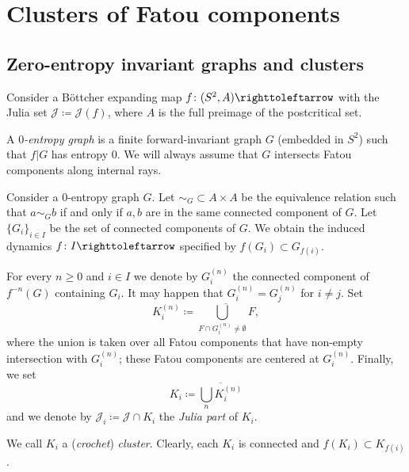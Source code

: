 \documentclass{amsart}
\theoremstyle{plain}
\theoremstyle{definition}
\theoremstyle{remark}
\newcommand{\Jul}{{\mathcal J}}
\newcommand\selfmap{\righttoleftarrow}
\begin{document}
\section{Clusters of Fatou components}
\label{sec:clusters}





\subsection{Zero-entropy invariant graphs and clusters}

Consider a B\"ottcher expanding map $f\colon (S^2,A)\selfmap$ with the Julia set $\Jul\coloneq \Jul(f)$, where $A$ is the full preimage of the postcritical set.

A \emph{$0$-entropy graph} is a finite forward-invariant graph $G$ (embedded in $S^2$) such that $f|G$ has entropy $0$. We will always assume that $G$ intersects Fatou components along internal rays.

Consider a $0$-entropy graph $G$. Let $\sim_{G}\subset A\times A$ be the equivalence relation such that $a\sim_G b$ if and only if $a,b$ are in the same connected component of $G$. Let $\{G_i\}_{i\in I}$ be the set of connected components of $G$. We obtain the induced dynamics $f\colon I\selfmap$ specified by $f(G_i)\subset G_{f(i)}$.

For every $n\ge0$ and $i\in I$ we denote by $G^{(n)}_i$ the connected component of $ f^{-n}(G)$ containing $G_i$. It may happen that $ G^{(n)}_i= G^{(n)}_j$ for $i\not=j$. Set \[K_i^{(n)} \coloneq \overline{\bigcup _{F\cap G_i^{(n)}\not=\emptyset} F},\]
where the union is taken over all Fatou components that have non-empty intersection with $G_i^{(n)}$; these Fatou components are centered at $G_i^{(n)}$. Finally, we set
\[K_i\coloneq  \overline{\bigcup_{n}K_i^{(n)}}\]
and we denote by
$\Jul_i\coloneq \Jul\cap K_i$ the \emph{Julia part} of $K_i$.


We call $K_i$ a (\emph{crochet}) \emph{cluster}. Clearly,  each $K_i$ is connected and $f(K_i)\subset K_{f(i)}$.
\end{document}
